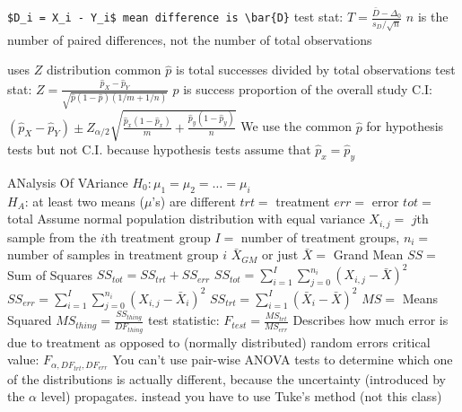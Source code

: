 \documentclass{article}
\begin{document}
\begin{multicols*}{2}
\begin{outline}[compactitem]
  \1 \verb|$D_i = X_i - Y_i$ mean difference is \bar{D}|
  \1 test stat: $T = \frac{\bar{D}-\Delta_0}{s_D / \sqrt{n}}$
    \2 $n$ is the number of paired differences, not the number of total observations

  \1 uses $Z$ distribution
  \1 common $\hat{p}$ is total successes divided by total observations
  \1 test stat: $Z = \frac{\hat{p}_X - \hat{p}_Y}{\sqrt{\hat{p}(1-\hat{p})(1/m+1/n)}}$
    \2 $\hat{p}$ is success proportion of the overall study
  \1 C.I: $(\hat{p}_X - \hat{p}_Y) \pm Z_{\alpha/2}
    \sqrt{
      \frac{\hat{p}_x(1-\hat{p}_x)}{m} + 
      \frac{\hat{p}_y(1-\hat{p}_y)}{n}
    }$
  \1 We use the common $\hat{p}$ for hypothesis tests but not C.I. because hypothesis tests assume that $\hat{p}_x = \hat{p}_y$

  \1 ANalysis Of VAriance
  \1 $H_0: \mu_1 = \mu_2 = \ldots = \mu_i$
  \\ $H_A$: at least two means ($\mu$'s) are different
  \1 $trt=$ treatment
  \1 $err=$ error
  \1 $tot=$ total
  \1 Assume normal population distribution with equal variance
  \1 $X_{i,j}=$ $j$th sample from the $i$th treatment group
    \2 $I=$ number of treatment groups, $n_i=$ number of samples in treatment group $i$
  \1 $\bar{X}_{GM}$ or just $\bar{X} = $ Grand Mean
  \1 $SS=$ Sum of Squares
    \2 $SS_{tot}=SS_{trt} + SS_{err}$
    \2 $SS_{tot}=\sum_{i=1}^I \sum_{j=0}^{n_i} \left( X_{i,j} - \bar{X} \right)^2 $
    \2 $SS_{err}=\sum_{i=1}^I \sum_{j=0}^{n_i} \left( X_{i,j} - \bar{X}_i \right)^2 $
    \2 $SS_{trt}=\sum_{i=1}^I \left( \bar{X}_i - \bar{X} \right)^2 $
    \2 
  \1 $MS=$ Means Squared
    \2 $MS_{thing} = \frac{SS_{thing}}{DF_{thing}}$
  \1 test statistic: $F_{test}=\frac{MS_{trt}}{MS_{err}}$
    \2 Describes how much error is due to treatment as opposed to (normally distributed) random errors
  \1 critical value: $F_{\alpha, DF_{trt}, DF_{err}}$
  \1 You can't use pair-wise ANOVA tests to determine which one of the distributions is actually different, because the uncertainty (introduced by the $\alpha$ level) propagates.
    \2 instead you have to use Tuke's method (not this class)


\end{outline}
\end{multicols*}
\end{document}
